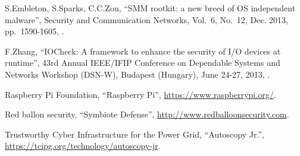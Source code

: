 \begin{thebibliography}{99}
S.Embleton, S.Sparks, C.C.Zou,
``SMM rootkit: a new breed of OS independent malware'',
Security and Communication Networks,
Vol.\ 6, No.\ 12,
Dec. 2013,
pp.\ 1590-1605,
.

F.Zhang,
``IOCheck: A framework to enhance the security of I/O devices at runtime'',
43rd Annual IEEE/IFIP Conference on Dependable Systems and Networks Workshop (DSN-W),
Budapest (Hungary), June 24-27, 2013,
.

Raspberry Pi Foundation,
``Raspberry Pi'',
\url{https://www.raspberrypi.org/}.

Red ballon security,
``Symbiote Defense'',
\url{http://www.redballoonsecurity.com}.

Trustworthy Cyber Infrastructure for the Power Grid,
``Autoscopy Jr.'',
\url{https://tcipg.org/technology/autoscopy-jr}.

\end{thebibliography}
